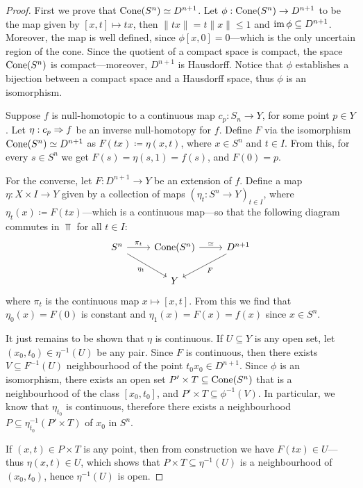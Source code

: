 \begin{proof}
    First we prove that \(\operatorname{Cone}(S^n) \simeq D^{n+1}\). Let
    \(\phi: \operatorname{Cone}(S^n) \to D^{n+1}\) to be the map given by \([x, t] \mapsto t x\),
    then \(\| t x \| = t \| x \| \leq 1\) and \(\operatorname{im} \phi \subseteq
    D^{n+1}\). Moreover, the map is well defined, since \(\phi[x, 0] = 0\)---which
    is the only uncertain region of the cone. Since the quotient of a compact space
    is compact, the space \(\operatorname{Cone}(S^n)\) is compact---moreover, \(D^{n+1}\) is
    Hausdorff. Notice that \(\phi\) establishes a bijection between a compact space
    and a Hausdorff space, thus \(\phi\) is an isomorphism.

    Suppose \(f\) is null-homotopic to a continuous map \(c_p: S_n \to Y\), for some
    point \(p \in Y\). Let \(\eta: c_p \Rightarrow f\) be an inverse null-homotopy for
    \(f\). Define \(F\) via the isomorphism \(\operatorname{Cone}(S^n) \simeq D^{n+1}\) as \(F(t x)
    \coloneq \eta(x, t)\), where \(x \in S^n\) and \(t \in I\). From this, for every
    \(s \in S^n\) we get \(F(s) = \eta(s, 1) = f(s)\), and \(F(0) = p\).

    For the converse, let \(F: D^{n+1} \to Y\) be an extension of \(f\). Define a
    map \(\eta: X \times I \to Y\) given by a collection of maps
    \((\eta_t: S^n \to Y)_{t \in I}\), where \(\eta_t(x) \coloneq F(t x)\)---which
    is a continuous map---so that the following diagram commutes in \(\Top\) for all
    \(t \in I\):
    \[
        \begin{tikzcd}
            S^n \ar[r, "\pi_t"] \ar[rd, "\eta_t"']
            &\Cone(S^n) \ar[r, "\dis"]
            &D^{n+1} \ar[ld, "F"] \\
            &Y &
        \end{tikzcd}
    \]
    where \(\pi_t\) is the continuous map \(x \mapsto [x, t]\). From this we find
    that \(\eta_0(x) = F(0)\) is constant and \(\eta_1(x) = F(x) = f(x)\) since
    \(x \in S^n\).

    It just remains to be shown that \(\eta\) is continuous. If \(U \subseteq Y\) is
    any open set, let \((x_0, t_0) \in \eta^{-1}(U)\) be any pair. Since \(F\) is
    continuous, then there exists \(V \subseteq F^{-1}(U)\) neighbourhood of the
    point \(t_0 x_0 \in D^{n+1}\). Since \(\phi\) is an isomorphism, there exists an
    open set \(P' \times T \subseteq \operatorname{Cone}(S^n)\) that is a neighbourhood of the
    class \([x_0, t_0]\), and \(P' \times T \subseteq \phi^{-1}(V)\). In particular,
    we know that \(\eta_{t_0}\) is continuous, therefore there exists a
    neighbourhood \(P \subseteq \eta_{t_0}^{-1}(P' \times T)\) of \(x_0\) in
    \(S^n\).

    If \((x, t) \in P \times T\) is any point, then from construction we have
    \(F(t x) \in U\)---thus \(\eta(x, t) \in U\), which shows that
    \(P \times T \subseteq \eta^{-1}(U)\) is a neighbourhood of \((x_0, t_0)\),
    hence \(\eta^{-1}(U)\) is open.
\end{proof}

